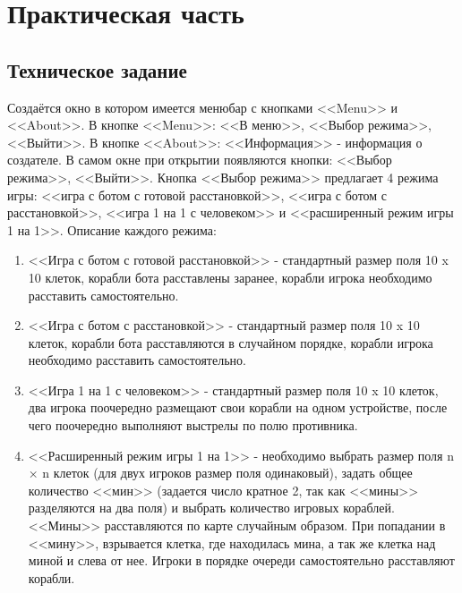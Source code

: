 \chapter{\label{ch:ch02}Практическая часть}
\section{\label{sec:ch02/sec01}Техническое задание}
Создаётся окно в котором имеется менюбар с кнопками <<Menu>> и <<About>>. В кнопке <<Menu>>: <<В меню>>, <<Выбор режима>>, <<Выйти>>. В кнопке <<About>>: <<Информация>> - информация о создателе. В самом окне при открытии появляются кнопки: <<Выбор режима>>, <<Выйти>>. Кнопка <<Выбор режима>> предлагает 4 режима игры: <<игра с ботом с готовой расстановкой>>, <<игра с ботом с расстановкой>>, <<игра 1 на 1 с человеком>> и <<расширенный режим игры 1 на 1>>. 
Описание каждого режима:
\begin{enumerate}
\item <<Игра с ботом с готовой расстановкой>> - стандартный размер поля 10 x 10 клеток, корабли бота расставлены заранее, корабли игрока необходимо расставить самостоятельно.
\item <<Игра с ботом с расстановкой>> - стандартный размер поля 10 x 10 клеток, корабли бота расставляются в случайном порядке, корабли игрока необходимо расставить самостоятельно.
\item <<Игра 1 на 1 с человеком>> - стандартный размер поля 10 x 10 клеток, два игрока поочередно размещают свои корабли на одном устройстве, после чего поочередно выполняют выстрелы по полю противника.
\item <<Расширенный режим игры 1 на 1>> - необходимо выбрать размер поля \- n × n клеток (для двух игроков размер поля одинаковый), задать общее количество <<мин>> (задается число кратное 2, так как <<мины>> разделяются на два поля) и выбрать количество игровых кораблей. <<Мины>> расставляются по карте случайным образом. При попадании в <<мину>>, взрывается клетка, где находилась мина, а так же клетка над миной и слева от  нее.  Игроки в порядке очереди самостоятельно расставляют корабли.
\end{enumerate}


